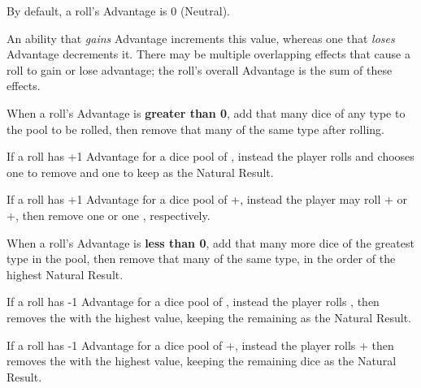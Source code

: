 \vspace{0.4em}

By default, a roll's Advantage is 0 (Neutral).

\vspace{0.4em}

An ability that \textit{gains} Advantage increments this value, 
whereas one that \textit{loses} Advantage decrements it.
There may be multiple overlapping effects that cause a roll 
to gain or lose advantage;
the roll's overall Advantage is the sum of these effects.

\vspace{0.4em}

When a roll's Advantage is \textbf{greater than 0}, 
add that many dice of any type to the pool to be rolled,
then remove that many of the same type after rolling.

\begin{Example}
  If a roll has +1 Advantage for a dice pool of , 
  instead the player rolls  and chooses one 
  to remove and one to keep as the Natural Result.

  \vspace{0.4em}

  If a roll has +1 Advantage for a dice pool of +,
  instead the player may roll + 
  or +, 
  then remove one  or one , respectively.
\end{Example}

\vspace{0.4em}

When a roll's Advantage is \textbf{less than 0}, 
add that many more dice of the greatest type in the pool, 
then remove that many of the same type,
in the order of the highest Natural Result.

\begin{Example}
  If a roll has -1 Advantage for a dice pool of , 
  instead the player rolls ,
  then removes the  with the highest value,
  keeping the remaining  as the Natural Result.

  \vspace{0.4em}

  If a roll has -1 Advantage for a dice pool of +,
  instead the player rolls + 
  then removes the  with the highest value,
  keeping the remaining dice as the Natural Result.
\end{Example}


